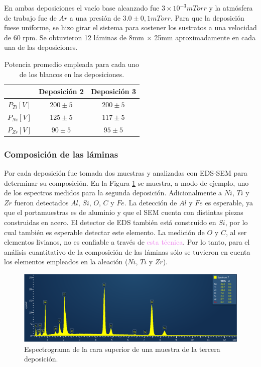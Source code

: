 \documentclass[12pt]{article}
\theoremstyle{definition}
\theoremstyle{remark}
\begin{document}
{En ambas deposiciones el vacío base alcanzado fue $3 \times 10^{-3}mTorr$ y la atmósfera de trabajo fue de $Ar$ a una presión de $3.0 \pm 0,1 mTorr$. Para que la deposición fuese uniforme, se hizo girar el sistema para sostener los sustratos a una velocidad de 60 rpm. Se obtuvieron 12 láminas de 8mm $\times$ 25mm aproximadamente en cada una de las deposiciones.

\begin{table}[H]
\centering
\begin{tabular}{|c|c|c|}
\hline
 & Deposición 2 & Deposición 3 \\ \hline
$P_{Ti}[V]$ & $200 \pm 5$ & $200 \pm 5$ \\ \hline
$P_{Ni}[V]$ & $125 \pm 5$ & $117 \pm 5$ \\ \hline
$P_{Zr}[V]$ & $90 \pm 5$ & $95 \pm 5$ \\ \hline
\end{tabular}
\caption{Potencia promedio empleada para cada uno de los blancos en las deposiciones.}
\label{potencias}
\end{table}

\subsubsection{Composición de las láminas}

Por cada deposición fue tomada dos muestras y analizadas con EDS-SEM para determinar su composición. En la Figura \ref{dep2} se muestra, a modo de ejemplo, uno de los espectros medidos para la segunda deposición. Adicionalmente a $Ni$, $Ti$ y $Zr$ fueron detectados $Al$, $Si$, $O$, $C$ y $Fe$. La detección de $Al$ y $Fe$ es esperable, ya que el portamuestras es de aluminio y que el SEM cuenta con distintas piezas construidas en acero. El detector de EDS también está construido en $Si$, por lo cual también es esperable detectar este elemento. La medición de $O$ y $C$, al ser elementos livianos, no es confiable a través de \textcolor{violet}{esta técnica}. Por lo tanto, para el análisis cuantitativo de la composición de las láminas sólo se tuvieron en cuenta los elementos empleados en la aleación ($Ni$, $Ti$ y $Zr$).

 \begin{figure}[H]
 	\centering
	\includegraphics[scale=0.5]{img/SEMAllElements.png}
 	\caption{Espectrograma de la cara superior de una muestra de la tercera deposición.}
	\label{dep2}
\end{figure} 

}
\end{document}
